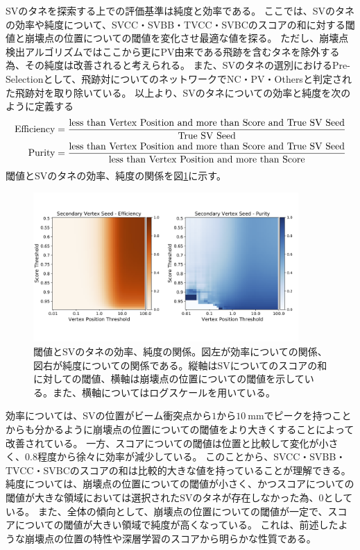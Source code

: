 SVのタネを探索する上での評価基準は純度と効率である。
ここでは、SVのタネの効率や純度について、SVCC・SVBB・TVCC・SVBCのスコアの和に対する閾値と崩壊点の位置についての閾値を変化させ最適な値を探る。
ただし、崩壊点検出アルゴリズムではここから更にPV由来である飛跡を含むタネを除外する為、その純度は改善されると考えられる。
また、SVのタネの選別におけるPre-Selectionとして、飛跡対についてのネットワークでNC・PV・Othersと判定された飛跡対を取り除いている。
以上より、SVのタネについての効率と純度を次のように定義する
\begin{equation}
 \begin{split}
{\rm Efficiency = \frac{less\ than\ Vertex\ Position\ and\ more\ than\ Score\ and\ True\ SV\ Seed}{True\ SV\ Seed}}\\
{\rm Purity = \frac{less\ than\ Vertex\ Position\ and\ more\ than\ Score\ and\ True\ SV\ Seed}{less\ than\ Vertex\ Position\ and\ more\ than\ Score}}
 \end{split}
\end{equation}
閾値とSVのタネの効率、純度の関係を図\ref{4-2-1-1SVSeed}に示す。

\begin{figure}[htbp]
 \centering
 \includegraphics[width=0.9\textwidth, clip]{Figure/4VertexFinderwithDL/4-2-1-1SVSeed.png}
 \caption[閾値とSVのタネの効率、純度の関係]{閾値とSVのタネの効率、純度の関係。図左が効率についての関係、図右が純度についての関係である。縦軸はSVについてのスコアの和に対しての閾値、横軸は崩壊点の位置についての閾値を示している。また、横軸についてはログスケールを用いている。}
 \label{4-2-1-1SVSeed}
\end{figure}

効率については、SVの位置がビーム衝突点から$1$から$10\ \mathrm{mm}$でピークを持つことからも分かるように崩壊点の位置についての閾値をより大きくすることによって改善されている。
一方、スコアについての閾値は位置と比較して変化が小さく、$0.8$程度から徐々に効率が減少している。
このことから、SVCC・SVBB・TVCC・SVBCのスコアの和は比較的大きな値を持っていることが理解できる。
純度については、崩壊点の位置についての閾値が小さく、かつスコアについての閾値が大きな領域においては選択されたSVのタネが存在しなかった為、$0$としている。
また、全体の傾向として、崩壊点の位置についての閾値が一定で、スコアについての閾値が大きい領域で純度が高くなっている。
これは、前述したような崩壊点の位置の特性や深層学習のスコアから明らかな性質である。

